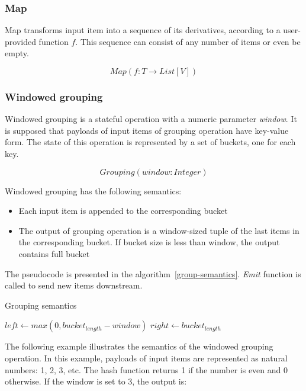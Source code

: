 \subsubsection{Map}
Map transforms input item into a sequence of its derivatives, according to a user-provided function $f$. This sequence can consist of any number of items or even be empty.

\[Map(f: T \rightarrow List[V])\]

\subsubsection{Windowed grouping}
Windowed grouping is a stateful operation with a numeric parameter {\it window}. It is supposed that payloads of input items of grouping operation have key-value form. The state of this operation is represented by a set of buckets, one for each key. 

\[Grouping(window: Integer)\]

Windowed grouping has the following semantics:

\begin{itemize}
    \item Each input item is appended to the corresponding bucket
    \item The output of grouping operation is a window-sized tuple of the last items in the corresponding bucket. If bucket size is less than window, the output contains full bucket
\end{itemize}

The pseudocode is presented in the algorithm~\ref{group-semantics}. {\it Emit} function is called to send new items downstream.

\begin{algorithm}
\caption{Grouping semantics}
\label{group-semantics}
  \begin{algorithmic}[1]
      \State {}
      \State $left \gets max(0, bucket_{length} - window)$
      \State $right \gets bucket_{length}$
      \State {}
    \EndFunction
  \end{algorithmic}
\end{algorithm}

The following example illustrates the semantics of the windowed grouping operation. In this example, payloads of input items are represented as natural numbers: 1, 2, 3, etc. The hash function returns 1 if the number is even and 0 otherwise. If the window is set to 3, the output is:

